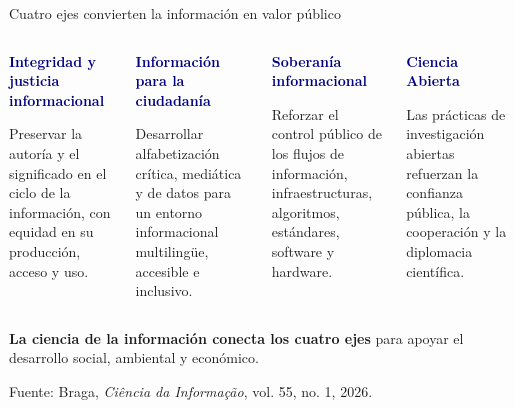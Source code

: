 \documentclass[aspectratio=169,11pt]{beamer}
\newcommand{\keypoint}[2]{%
  \begin{minipage}[t]{0.98\linewidth}
  \colorbox{Mist}{\parbox{0.92\linewidth}{\raggedright\vspace{0.08cm}\textcolor{Navy}{\bfseries #1}\par\small #2\vspace{0.08cm}}}
  \end{minipage}}
\begin{document}
\begin{frame}{Cuatro ejes convierten la información en valor público}
  \vspace{0.08cm}
  \begin{columns}[T,onlytextwidth]
      \keypoint{Integridad y justicia informacional}{Preservar la autoría y el significado en el ciclo de la información, con equidad en su producción, acceso y uso.}
      \vspace{0.28cm}

      \keypoint{Información para la ciudadanía}{Desarrollar alfabetización crítica, mediática y de datos para un entorno informacional multilingüe, accesible e inclusivo.}
      \keypoint{Soberanía informacional}{Reforzar el control público de los flujos de información, infraestructuras, algoritmos, estándares, software y hardware.}
      \vspace{0.28cm}

      \keypoint{Ciencia Abierta}{Las prácticas de investigación abiertas refuerzan la confianza pública, la cooperación y la diplomacia científica.}
  \end{columns}
  \vfill
  \begin{center}
    \small\alert{\textbf{La ciencia de la información conecta los cuatro ejes} para apoyar el desarrollo social, ambiental y económico.}

    \vspace{0.09cm}
    {\tiny Fuente: Braga, \textit{Ciência da Informação}, vol. 55, no. 1, 2026.}
  \end{center}
\end{frame}
\end{document}
